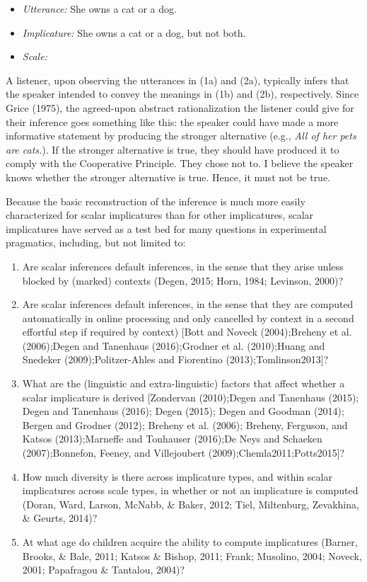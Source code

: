 \documentclass[floatsintext,man]{apa6}
\providecommand{\tightlist}{%
  \setlength{\itemsep}{0pt}\setlength{\parskip}{0pt}}
\theoremstyle{definition}
\theoremstyle{definition}
\theoremstyle{definition}
\theoremstyle{remark}
\begin{document}
\begin{itemize}
\tightlist
\item
  \emph{Utterance:} She owns a cat or a dog.
\item
  \emph{Implicature:} She owns a cat or a dog, but not both.
\item
  \emph{Scale:} 
\end{itemize}

A listener, upon observing the utterances in (1a) and (2a), typically
infers that the speaker intended to convey the meanings in (1b) and
(2b), respectively. Since Grice (1975), the agreed-upon abstract
rationalization the listener could give for their inference goes
something like this: the speaker could have made a more informative
statement by producing the stronger alternative (e.g., \emph{All of her
pets are cats.}). If the stronger alternative is true, they should have
produced it to comply with the Cooperative Principle. They chose not to.
I believe the speaker knows whether the stronger alternative is true.
Hence, it must not be true.

Because the basic reconstruction of the inference is much more easily
characterized for scalar implicatures than for other implicatures,
scalar implicatures have served as a test bed for many questions in
experimental pragmatics, including, but not limited to:

\begin{enumerate}
\def\labelenumi{\arabic{enumi}.}
\item
  Are scalar inferences default inferences, in the sense that they arise
  unless blocked by (marked) contexts (Degen, 2015; Horn, 1984;
  Levinson, 2000)?
\item
  Are scalar inferences default inferences, in the sense that they are
  computed automatically in online processing and only cancelled by
  context in a second effortful step if required by context) {[}Bott and
  Noveck (2004);Breheny et al. (2006);Degen and Tanenhaus (2016);Grodner
  et al. (2010);Huang and Snedeker (2009);Politzer-Ahles and Fiorentino
  (2013);Tomlinson2013{]}?
\item
  What are the (linguistic and extra-linguistic) factors that affect
  whether a scalar implicature is derived {[}Zondervan (2010);Degen and
  Tanenhaus (2015); Degen and Tanenhaus (2016); Degen (2015); Degen and
  Goodman (2014); Bergen and Grodner (2012); Breheny et al. (2006);
  Breheny, Ferguson, and Katsos (2013);Marneffe and Tonhauser (2016);De
  Neys and Schaeken (2007);Bonnefon, Feeney, and Villejoubert
  (2009);Chemla2011;Potts2015{]}?
\item
  How much diversity is there across implicature types, and within
  scalar implicatures across scale types, in whether or not an
  implicature is computed (Doran, Ward, Larson, McNabb, \& Baker, 2012;
  Tiel, Miltenburg, Zevakhina, \& Geurts, 2014)?
\item
  At what age do children acquire the ability to compute implicatures
  (Barner, Brooks, \& Bale, 2011; Katsos \& Bishop, 2011; Frank;
  Musolino, 2004; Noveck, 2001; Papafragou \& Tantalou, 2004)?
\end{enumerate}
\end{document}
